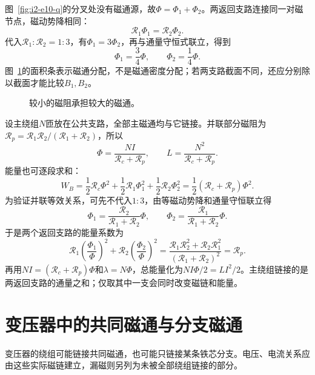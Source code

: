 \begin{solution}
图~\ref{fig:i2-e10-q}的分叉处没有磁通源，故$\Phi=\Phi_1+\Phi_2$。两返回支路连接同一对磁节点，磁动势降相同：
\[\mathcal R_1\Phi_1=\mathcal R_2\Phi_2.
\]
代入$\mathcal R_1:\mathcal R_2=1:3$，有$\Phi_1=3\Phi_2$，再与通量守恒式联立，得到
\[\boxed{\Phi_1=\frac34\Phi,\qquad\Phi_2=\frac14\Phi}.
\]
图~\ref{fig:i2-e10-s}的面积条表示磁通分配，不是磁通密度分配；若两支路截面不同，还应分别除以截面才能比较$B_1,B_2$。


\begin{figure}[H]\centering
{}
\caption{较小的磁阻承担较大的磁通。}\label{fig:i2-e10-s}
\end{figure}

设主绕组$N$匝放在公共支路，全部主磁通均与它链接。并联部分磁阻为$\mathcal R_p=\mathcal R_1\mathcal R_2/(\mathcal R_1+\mathcal R_2)$，所以
\[\Phi=\frac{NI}{\mathcal R_c+\mathcal R_p},\qquad
\boxed{L=\frac{N^2}{\mathcal R_c+\mathcal R_p}}.
\]
能量也可逐段求和：
\[W_B=\frac12\mathcal R_c\Phi^2+
\frac12\mathcal R_1\Phi_1^2+\frac12\mathcal R_2\Phi_2^2
=\frac12(\mathcal R_c+\mathcal R_p)\Phi^2.
\]
为验证并联等效关系，可先不代入$1:3$，由等磁动势降和通量守恒联立得
\[
\Phi_1=\frac{\mathcal R_2}{\mathcal R_1+\mathcal R_2}\Phi,\qquad
\Phi_2=\frac{\mathcal R_1}{\mathcal R_1+\mathcal R_2}\Phi.
\]
于是两个返回支路的能量系数为
\[
\mathcal R_1\left(\frac{\Phi_1}{\Phi}\right)^2
+\mathcal R_2\left(\frac{\Phi_2}{\Phi}\right)^2
=\frac{\mathcal R_1\mathcal R_2^2+\mathcal R_2\mathcal R_1^2}
{(\mathcal R_1+\mathcal R_2)^2}
=\mathcal R_p.
\]
再用$NI=(\mathcal R_c+\mathcal R_p)\Phi$和$\lambda=N\Phi$，总能量化为$NI\Phi/2=LI^2/2$。主绕组链接的是两返回支路的通量之和；仅取其中一支会同时改变磁链和能量。
\end{solution}


\section{变压器中的共同磁通与分支磁通}\label{sec:i2-transformer}
变压器的绕组可能链接共同磁通，也可能只链接某条铁芯分支。电压、电流关系应由这些实际磁链建立，漏磁则另列为未被全部绕组链接的部分。

